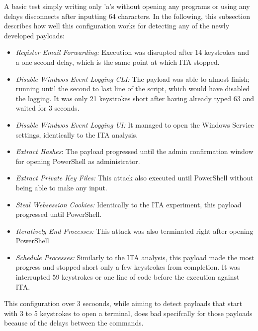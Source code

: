 A basic test simply writing only 'a's without opening any programs or using any delays disconnects after inputting 64 characters. In the following, this subsection describes how well this configuration works for detecting any of the newly developed payloads:


 \begin{itemize}
    \item  \emph{Register Email Forwarding:} Execution was disrupted after 14 keystrokes and a one second delay, which is the same point at which ITA stopped.
    \item  \emph{Disable Windwos Event Logging CLI:} The payload was able to almost finish; running until the second to last line of the script, which would have disabled the logging. It was only 21 keystrokes short after having already typed 63 and waited for 3 seconds.
    \item  \emph{Disable Windwos Event Logging UI:}  It managed to open the Windows Service settings, identically to the ITA analysis.
    \item  \emph{Extract Hashes}: The payload progressed until the admin confirmation window for opening PowerShell as administrator.
    \item  \emph{Extract Private Key Files:} This attack also executed until PowerShell without being able to make any input. 
    \item  \emph{Steal Websession Cookies:} Identically to the ITA experiment, this payload progressed until PowerShell.
    \item  \emph{Iteratively End Processes:} This attack was also terminated right after opening PowerShell
    \item  \emph{Schedule Processes:} Similarly to the ITA analysis, this payload made the most progress and stopped short only a few keystrokes from completion. It was interrupted 59 keystrokes or one line of code before the execution against ITA.
\end{itemize}

This configuration over 3 secoonds, while aiming to detect payloads that start with 3 to 5 keystrokes to open a terminal, does bad specifcally for those payloads because of the delays between the commands.
